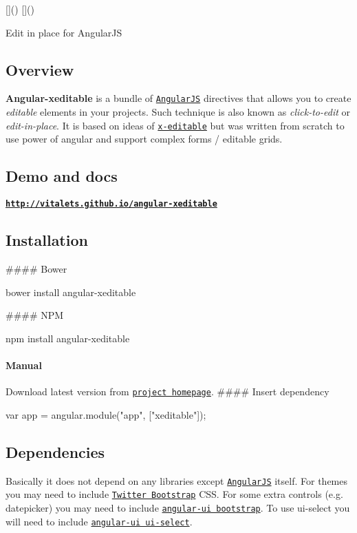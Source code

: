 \mbox{[}\mbox{]}() \mbox{[}\mbox{]}()

Edit in place for Angular\+JS

\subsection*{Overview}

{\bfseries Angular-\/xeditable} is a bundle of \href{http://angularjs.org}{\tt Angular\+JS} directives that allows you to create {\itshape editable} elements in your projects. Such technique is also known as {\itshape click-\/to-\/edit} or {\itshape edit-\/in-\/place}. It is based on ideas of \href{http://vitalets.github.io/x-editable}{\tt x-\/editable} but was written from scratch to use power of angular and support complex forms / editable grids.

\subsection*{Demo and docs}

{\bfseries \href{http://vitalets.github.io/angular-xeditable}{\tt http\+://vitalets.\+github.\+io/angular-\/xeditable}}

\subsection*{Installation}

\#\#\#\# Bower 
\begin{DoxyCode}
bower install angular-xeditable
\end{DoxyCode}
 \#\#\#\# N\+PM 
\begin{DoxyCode}
npm install angular-xeditable
\end{DoxyCode}
 \paragraph*{Manual}

Download latest version from \href{http://vitalets.github.io/angular-xeditable}{\tt project homepage}. \#\#\#\# Insert dependency 
\begin{DoxyCode}
var app = angular.module("app", ["xeditable"]);
\end{DoxyCode}


\subsection*{Dependencies}

Basically it does not depend on any libraries except \href{http://angularjs.org}{\tt Angular\+JS} itself. For themes you may need to include \href{http://getbootstrap.com}{\tt Twitter Bootstrap} C\+SS. For some extra controls (e.\+g. datepicker) you may need to include \href{http://angular-ui.github.io/bootstrap/}{\tt angular-\/ui bootstrap}. To use ui-\/select you will need to include \href{https://github.com/angular-ui/ui-select/}{\tt angular-\/ui ui-\/select}.

